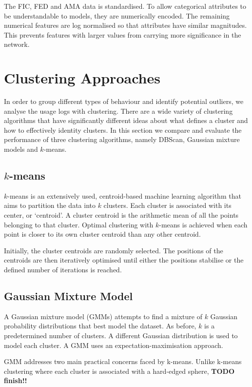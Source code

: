 \documentclass[a4paper,12pt]{report}
\begin{document}
	The FIC, FED and AMA data is standardised. To allow categorical attributes to be understandable to models, they are numerically encoded. The remaining numerical features are log normalised so that attributes have similar magnitudes. This prevents features with larger values from carrying more significance in the network.
	
	
	\section{Clustering Approaches}
	In order to group different types of behaviour and identify potential outliers, we analyse the usage logs with clustering. There are a wide variety of clustering algorithms that have significantly different ideas about what defines a cluster and how to effectively identity clusters. In this section we compare and evaluate the performance of three clustering algorithms, namely DBScan, Gaussian mixture models and $k$-means. 
	
	\subsection{$k$-means}
	$k$-means is an extensively used, centroid-based machine learning algorithm that aims to partition the data into $k$ clusters. Each cluster is associated with its center, or `centroid’. A cluster centroid is the arithmetic mean of all the points belonging to that cluster. Optimal clustering with $k$-means is achieved when each point is closer to its own cluster centroid than any other centroid. 
	
	Initially, the cluster centroids are randomly selected. The positions of the centroids are then iteratively optimised until either the positions stabilise or the defined number of iterations is reached.
	
	\subsection{Gaussian Mixture Model}
	A Gaussian mixture model (GMMs) attempts to find a mixture of $k$ Gaussian probability distributions that best model the dataset. As before, $k$ is a predetermined number of clusters. A different Gaussian distribution is used to model each cluster. A GMM uses an expectation-maximisation approach.
	
	GMM addresses two main practical concerns faced by k-means.
	Unlike k-means clustering where each cluster is associated with a hard-edged sphere, \textbf{TODO finish!!} %
	
\end{document}
